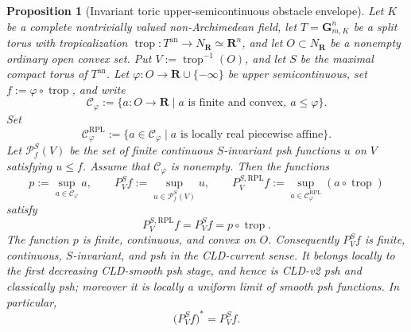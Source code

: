 \documentclass[11pt,a4paper]{article}
\newtheorem{proposition}[proposition]{Proposition}
\theoremstyle{definition}
\theoremstyle{remark}
\begin{document}
\begin{proposition}[Invariant toric upper-semicontinuous obstacle envelope]
\label{prop:p033-invariant-toric-real-pl-envelope}
Let $K$ be a complete nontrivially valued non-Archimedean field, let
$T=\mathbf G_{m,K}^n$ be a split torus with tropicalization
\(\operatorname{trop}:T^{\mathrm{an}}\to N_{\mathbf R}\simeq\mathbf R^n\), and let
\(O\subset N_{\mathbf R}\) be a nonempty ordinary open convex set.  Put
\(V:=\operatorname{trop}^{-1}(O)\), and let $S$ be the maximal compact torus
of $T^{\mathrm{an}}$.  Let
\(\varphi:O\to\mathbf R\cup\{-\infty\}\) be upper semicontinuous, set
\(f:=\varphi\circ\operatorname{trop}\), and write
\[
 \mathcal C_\varphi
 :=\{a:O\to\mathbf R\mid a\text{ is finite and convex},\ a\leq\varphi\}.
\]
Set
\[
 \mathcal C_\varphi^{\mathrm{RPL}}
 :=\{a\in\mathcal C_\varphi\mid a\text{ is locally real piecewise affine}\}.
\]
Let \(\mathcal P^S_f(V)\) be the set of finite continuous \(S\)-invariant
psh functions \(u\) on \(V\) satisfying \(u\leq f\).  Assume that
\(\mathcal C_\varphi\) is nonempty.  Then the functions
\[
 p:=\sup_{a\in\mathcal C_\varphi}a,
 \qquad
 P^S_Vf:=\sup_{u\in\mathcal P^S_f(V)}u,
 \qquad
 P^{S,\mathrm{RPL}}_V f
 :=\sup_{a\in\mathcal C_\varphi^{\mathrm{RPL}}}
        (a\circ\operatorname{trop})
\]
satisfy
\[
 P^{S,\mathrm{RPL}}_V f=P^S_Vf=p\circ\operatorname{trop}.
\]
The function $p$ is finite, continuous, and convex on $O$.  Consequently
\(P^S_Vf\) is finite, continuous, \(S\)-invariant, and psh in the
CLD-current sense.  It belongs locally to the first decreasing CLD-smooth
psh stage, and hence is CLD-v2 psh and classically psh; moreover it is locally a
uniform limit of smooth psh functions.  In particular,
\[
 \bigl(P^S_Vf\bigr)^*=P^S_Vf.
\]
\end{proposition}
\end{document}
